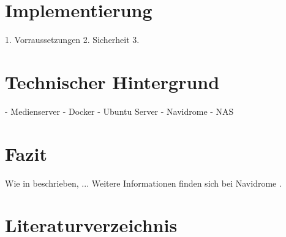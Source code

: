 \documentclass[12pt,a4paper]{article}
\begin{document}
\section{Implementierung}
1. Vorraussetzungen
2. Sicherheit
3. 

\section{Technischer Hintergrund}
- Medienserver
- Docker
- Ubuntu Server
- Navidrome
- NAS

\section{Fazit}


Wie in \textcite{kuster2005musikinformatik} beschrieben, ...
Weitere Informationen finden sich bei Navidrome \parencite{navidrome2024}.

\section{Literaturverzeichnis}

\printbibliography
\end{document}

